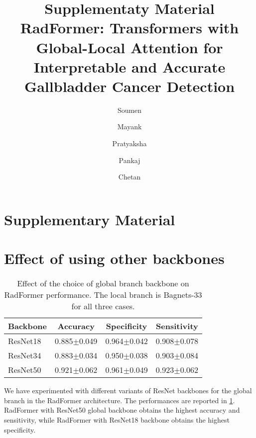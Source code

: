 \documentclass[twocolumn,final]{elsarticle}
\def\myarch{RadFormer\xspace}
\newcommand{\beginsupplement}{%
    \setcounter{table}{0}
    \renewcommand{\thetable}{S\arabic{table}}%
    \setcounter{figure}{0}
    \renewcommand{\thefigure}{S\arabic{figure}}%
 }
\begin{document}

\title{Supplementaty Material \\ \myarch: Transformers with Global-Local Attention for Interpretable and Accurate Gallbladder Cancer Detection}


\author[1]{Soumen }
\author[1]{Mayank }
\author[2]{Pratyaksha }
\author[2]{Pankaj }
\author[1]{Chetan }


\address[1]{Department of Computer Science, Indian Institute of Technology Delhi, New Delhi, India}
\address[2]{Department of Radiodiagnosis and Imaging, Postgraduate Institute of Medical Education \& Research, Chandigarh, India}

\maketitle

\section*{Supplementary Material}

\appendix
\beginsupplement

\section{Effect of using other backbones}
%
\begin{table}[t]
   \centering
	\begin{tabular}{lccc}
		\toprule
		\textbf{Backbone} & \textbf{Accuracy} 
		&  \textbf{Specificity} & \textbf{Sensitivity}  \\
		\midrule
		ResNet18 & 0.885$\pm$0.049 & 0.964$\pm$0.042 & 0.908$\pm$0.078 \\
		ResNet34 & 0.883$\pm$0.034 & 0.950$\pm$0.038 & 0.903$\pm$0.084 \\
		ResNet50 & 0.921$\pm$0.062 & 0.961$\pm$0.049 & 0.923$\pm$0.062 \\
		\bottomrule
	\end{tabular}
	\caption{Effect of the choice of global branch backbone on \myarch performance. The local branch is Bagnets-33 for all three cases.}
    \label{tab:ablation-backbone}
\end{table}
We have experimented with different variants of ResNet backbones for the global branch in the \myarch architecture. The performances are reported in \cref{tab:ablation-backbone}. \myarch with ResNet50 global backbone obtains the highest accuracy and sensitivity, while \myarch with ResNet18 backbone obtains the highest specificity.
\end{document}
